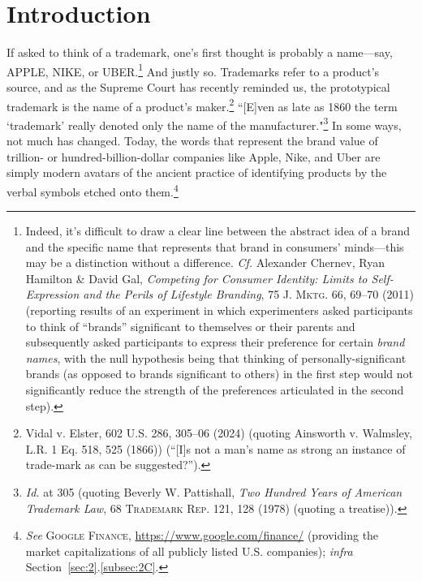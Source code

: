 \documentclass[letterpaper, 11pt, oneside]{article}
\begin{document}
\tableofcontents

\pagestyle{subsequentpages}
\addtocounter{page}{1}

\section*{Introduction}\label{sec:0}

If asked to think of a trademark, one's first thought is probably a name—say, APPLE, NIKE, or UBER.\footnote{Indeed, it's difficult to draw a clear line between the abstract idea of a brand and the specific name that represents that brand in consumers' minds—this may be a distinction without a difference. \textit{Cf.} Alexander Chernev, Ryan Hamilton \& David Gal, \textit{Competing for Consumer Identity: Limits to Self-Expression and the Perils of Lifestyle Branding}, 75 \textsc{J. Mktg.} 66, 69–70 (2011) (reporting results of an experiment in which experimenters asked participants to think of ``brands'' significant to themselves or their parents and subsequently asked participants to express their preference for certain \textit{brand names}, with the null hypothesis being that thinking of personally-significant brands (as opposed to brands significant to others) in the first step would not significantly reduce the strength of the preferences articulated in the second step).} And justly so. Trademarks refer to a product's source, and as the Supreme Court has recently reminded us, the prototypical trademark is the name of a product's maker.\footnote{\label{supra1} Vidal v. Elster, 602 U.S. 286, 305–06 (2024) (quoting Ainsworth v. Walmsley, L.R. 1 Eq. 518, 525 (1866)) (``[I]s not a man’s name as strong an instance of trade-mark as can be suggested?'').} ``[E]ven as late as 1860 the term `trademark' really denoted only the name of the manufacturer."\footnote{\textit{Id.} at 305 (quoting Beverly W. Pattishall, \textit{Two Hundred Years of American Trademark Law}, 68 \textsc{Trademark Rep.} 121, 128 (1978) (quoting a treatise)).} In some ways, not much has changed. Today, the words that represent the brand value of trillion- or hundred-billion-dollar companies like Apple, Nike, and Uber are simply modern avatars of the ancient practice of identifying products by the verbal symbols etched onto them.\footnote{\textit{See} \textsc{Google Finance}, \url{https://www.google.com/finance/} (providing the market capitalizations of all publicly listed U.S. companies); \textit{infra} Section~\ref{sec:2}.\ref{subsec:2C}.}
\end{document}

